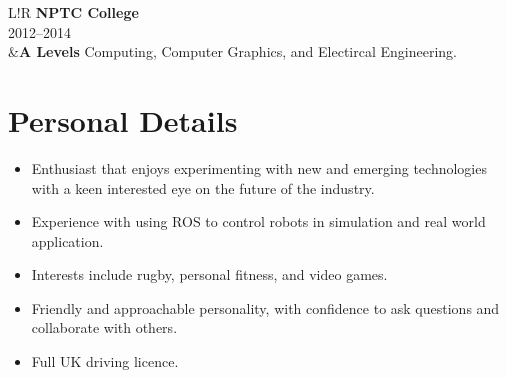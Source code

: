 \documentclass[10pt]{article}
\newcommand\VRule{\color{lightgray}\vrule width 0.5pt}
\begin{document}
\begin{longtable}{L!{\VRule}R}
{\bf NPTC College}\\
2012--2014\\
&{\bf A Levels}\newline
Computing, Computer Graphics, and Electircal Engineering.

\end{longtable}

\section*{Personal Details}
\begin{itemize}[noitemsep,topsep=0pt]
    \item Enthusiast that enjoys experimenting with new and emerging technologies with a keen interested eye on the future of the industry.
    \item Experience with using ROS to control robots in simulation and real world application.
	\item Interests include rugby, personal fitness, and video games.
	\item Friendly and approachable personality, with confidence to ask questions and collaborate with others.
	\item Full UK driving licence.
\end{itemize}
\end{document}
